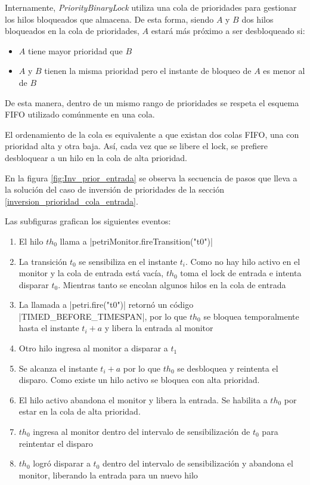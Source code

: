 Internamente, \textit{PriorityBinaryLock} utiliza una cola de prioridades para
gestionar los hilos bloqueados que almacena. De esta forma, siendo $A$ y $B$
dos hilos bloqueados en la cola de prioridades, $A$ estará más próximo a ser
desbloqueado si:
\begin{itemize}
  \item $A$ tiene mayor prioridad que $B$
  \item $A$ y $B$ tienen la misma prioridad pero el instante de bloqueo de $A$
  es menor al de $B$
\end{itemize}

De esta manera, dentro de un mismo rango de prioridades se respeta el esquema
FIFO utilizado comúnmente en una cola.

El ordenamiento de la cola es equivalente a que existan dos colas FIFO, una con
prioridad alta y otra baja. Así, cada vez que se libere el lock, se prefiere
desbloquear a un hilo en la cola de alta prioridad.

En la figura \ref{fig:Inv_prior_entrada} se observa la secuencia de pasos que
lleva a la solución del caso de inversión de prioridades de la sección
\ref{inversion_prioridad_cola_entrada}.

Las subfiguras grafican los siguientes eventos:
\begin{enumerate}[label=\alph*)]
    \item El hilo $th_{0}$ llama a
    |petriMonitor.fireTransition("t0")|
    \item La transición $t_{0}$ se sensibiliza en el instante $t_{i}$. Como no
    hay hilo activo en el monitor y la cola de entrada está vacía, $th_{0}$ toma
    el lock de entrada e intenta disparar $t_{0}$. Mientras tanto se encolan
    algunos hilos en la cola de entrada
    \item La llamada a |petri.fire("t0")| retornó un código
    |TIMED_BEFORE_TIMESPAN|, por lo que $th_{0}$ se bloquea
    temporalmente hasta el instante $t_{i}+a$ y libera la entrada al monitor
    \item Otro hilo ingresa al monitor a disparar a $t_{1}$
    \item Se alcanza el instante $t_{i}+a$ por lo que $th_{0}$ se desbloquea y
    reintenta el disparo. Como existe un hilo activo se bloquea con alta
    prioridad.
    \item El hilo activo abandona el monitor y libera la entrada. Se habilita a
    $th_{0}$ por estar en la cola de alta prioridad.
    \item $th_{0}$ ingresa al monitor dentro del intervalo de sensibilización de
    $t_{0}$ para reintentar el disparo
    \item $th_0$ logró disparar a $t_{0}$ dentro del intervalo de
    sensibilización y abandona el monitor, liberando la entrada para un nuevo hilo
\end{enumerate}

